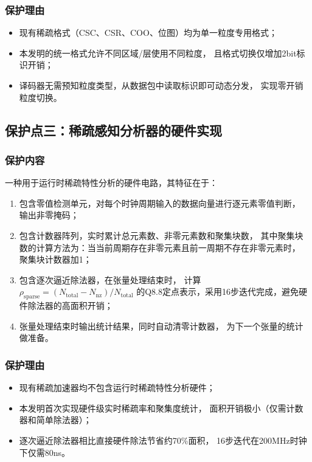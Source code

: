 \documentclass[a4paper,12pt,fontset=ubuntu]{ctexart}
\begin{document}
\subsubsection{保护理由}

\begin{itemize}
  \item 现有稀疏格式（CSC、CSR、COO、位图）均为单一粒度专用格式；
  \item 本发明的统一格式允许不同区域/层使用不同粒度，
        且格式切换仅增加2bit标识开销；
  \item 译码器无需预知粒度类型，从数据包中读取标识即可动态分发，
        实现零开销粒度切换。
\end{itemize}

\subsection{保护点三：稀疏感知分析器的硬件实现}

\subsubsection{保护内容}

一种用于运行时稀疏特性分析的硬件电路，其特征在于：

\begin{enumerate}
  \item 包含零值检测单元，对每个时钟周期输入的数据向量进行逐元素零值判断，
        输出非零掩码；

  \item 包含计数器阵列，实时累计总元素数、非零元素数和聚集块数，
        其中聚集块数的计算方法为：当当前周期存在非零元素且前一周期不存在非零元素时，
        聚集块计数器加1；

  \item 包含逐次逼近除法器，在张量处理结束时，
        计算$\rho_{\text{sparse}} = (N_{\text{total}} - N_{\text{nz}}) / N_{\text{total}}$
        的Q8.8定点表示，采用16步迭代完成，避免硬件除法器的高面积开销；

  \item 张量处理结束时输出统计结果，同时自动清零计数器，
        为下一个张量的统计做准备。
\end{enumerate}

\subsubsection{保护理由}

\begin{itemize}
  \item 现有稀疏加速器均不包含运行时稀疏特性分析硬件；
  \item 本发明首次实现硬件级实时稀疏率和聚集度统计，
        面积开销极小（仅需计数器和简单除法器）；
  \item 逐次逼近除法器相比直接硬件除法节省约70\%面积，
        16步迭代在200MHz时钟下仅需80ns。
\end{itemize}
\end{document}
